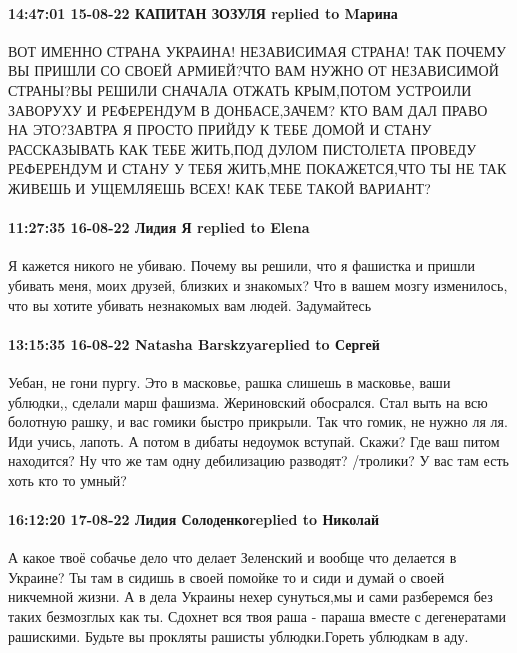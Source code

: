  
 
 
 
 

\paragraph{14:47:01 15-08-22 КАПИТАН ЗОЗУЛЯ replied to Mарина}

ВОТ ИМЕННО СТРАНА УКРАИНА! НЕЗАВИСИМАЯ СТРАНА! ТАК ПОЧЕМУ ВЫ ПРИШЛИ СО СВОЕЙ
АРМИЕЙ?ЧТО ВАМ НУЖНО ОТ НЕЗАВИСИМОЙ СТРАНЫ?ВЫ РЕШИЛИ СНАЧАЛА ОТЖАТЬ КРЫМ,ПОТОМ
УСТРОИЛИ ЗАВОРУХУ И РЕФЕРЕНДУМ В ДОНБАСЕ,ЗАЧЕМ? КТО ВАМ ДАЛ ПРАВО НА ЭТО?ЗАВТРА
Я ПРОСТО ПРИЙДУ К ТЕБЕ ДОМОЙ И СТАНУ РАССКАЗЫВАТЬ КАК ТЕБЕ ЖИТЬ,ПОД ДУЛОМ
ПИСТОЛЕТА ПРОВЕДУ РЕФЕРЕНДУМ И СТАНУ У ТЕБЯ ЖИТЬ,МНЕ ПОКАЖЕТСЯ,ЧТО ТЫ НЕ ТАК
ЖИВЕШЬ И УЩЕМЛЯЕШЬ ВСЕХ! КАК ТЕБЕ ТАКОЙ ВАРИАНТ?

\paragraph{11:27:35 16-08-22 Лидия Я replied to Elena}

Я кажется никого не убиваю. Почему вы решили, что я фашистка и пришли убивать
меня, моих друзей, близких и знакомых? Что в вашем мозгу изменилось, что вы
хотите убивать незнакомых вам людей. Задумайтесь

\paragraph{13:15:35 16-08-22 Natasha Barskzyareplied to Сергей}

Уебан, не гони пургу. Это в масковье, рашка слишешь в масковье, ваши ублюдки,,
сделали марш фашизма. Жериновский обосрался. Стал выть на всю болотную рашку, и
вас гомики быстро прикрыли. Так что гомик, не нужно ля ля. Иди учись, лапоть. А
потом в дибаты недоумок вступай. Скажи? Где ваш питом находится? Ну что же там
одну дебилизацию разводят? /тролики? У вас там есть хоть кто то умный?


\paragraph{16:12:20 17-08-22 Лидия Солоденкоreplied to Николай}

А какое твоё собачье дело что делает Зеленский и вообще что делается в Украине?
Ты там в сидишь в своей помойке то и сиди и думай о своей никчемной жизни.
А в дела Украины нехер сунуться,мы и сами разберемся без таких безмозглых как ты.
Сдохнет вся твоя раша - параша вместе с дегенератами рашискими.
Будьте вы прокляты рашисты ублюдки.Гореть ублюдкам в аду.

